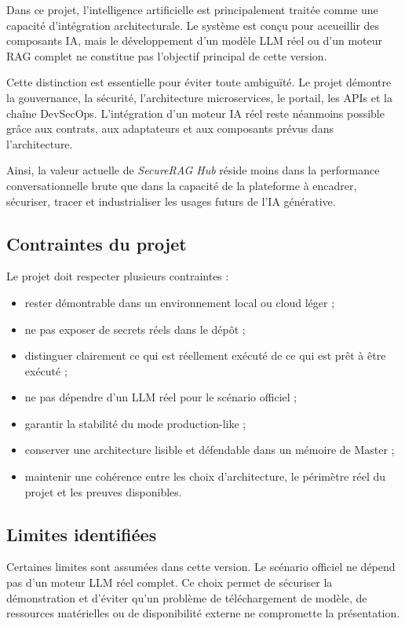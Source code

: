Dans ce projet, l’intelligence artificielle est principalement traitée comme une capacité d’intégration architecturale. Le système est conçu pour accueillir des composants IA, mais le développement d’un modèle LLM réel ou d’un moteur RAG complet ne constitue pas l’objectif principal de cette version.

Cette distinction est essentielle pour éviter toute ambiguïté. Le projet démontre la gouvernance, la sécurité, l’architecture microservices, le portail, les APIs et la chaîne DevSecOps. L’intégration d’un moteur IA réel reste néanmoins possible grâce aux contrats, aux adaptateurs et aux composants prévus dans l’architecture.

Ainsi, la valeur actuelle de \textit{SecureRAG Hub} réside moins dans la performance conversationnelle brute que dans la capacité de la plateforme à encadrer, sécuriser, tracer et industrialiser les usages futurs de l’IA générative.

\subsection{Contraintes du projet}

Le projet doit respecter plusieurs contraintes :

\begin{itemize}
    \item rester démontrable dans un environnement local ou cloud léger ;
    \item ne pas exposer de secrets réels dans le dépôt ;
    \item distinguer clairement ce qui est réellement exécuté de ce qui est prêt à être exécuté ;
    \item ne pas dépendre d’un LLM réel pour le scénario officiel ;
    \item garantir la stabilité du mode production-like ;
    \item conserver une architecture lisible et défendable dans un mémoire de Master ;
    \item maintenir une cohérence entre les choix d’architecture, le périmètre réel du projet et les preuves disponibles.
\end{itemize}

\subsection{Limites identifiées}

Certaines limites sont assumées dans cette version. Le scénario officiel ne dépend pas d’un moteur LLM réel complet. Ce choix permet de sécuriser la démonstration et d’éviter qu’un problème de téléchargement de modèle, de ressources matérielles ou de disponibilité externe ne compromette la présentation.

